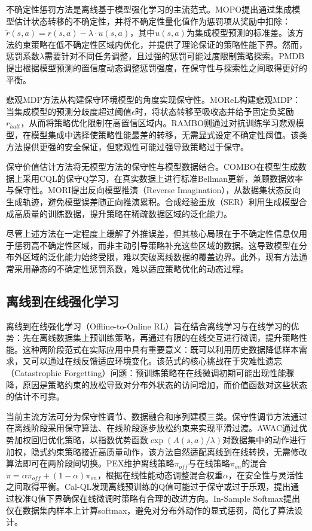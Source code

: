 不确定性惩罚方法是离线基于模型强化学习的主流范式。MOPO\cite{Yu2020MOPO}提出通过集成模型估计状态转移的不确定性，并将不确定性量化值作为惩罚项从奖励中扣除：$\tilde{r}(s,a) = r(s,a) - \lambda \cdot u(s,a)$，其中$u(s,a)$为集成模型预测的标准差。该方法约束策略在低不确定性区域内优化，并提供了理论保证的策略性能下界。然而，惩罚系数$\lambda$需要针对不同任务调整，且过强的惩罚可能过度限制策略探索。PMDB\cite{Yang2023PMDB}提出根据模型预测的置信度动态调整惩罚强度，在保守性与探索性之间取得更好的平衡。

悲观MDP方法从构建保守环境模型的角度实现保守性。MOReL\cite{Kidambi2020MOReL}构建悲观MDP：当集成模型的预测分歧度超过阈值$\epsilon$时，将状态转移至吸收态并给予固定负奖励$r_{halt}$，从而将策略优化限制在高置信区域内。RAMBO\cite{Rigter2022RAMBO}则通过对抗训练学习悲观模型，在模型集成中选择使策略性能最差的转移，无需显式设定不确定性阈值。该类方法提供更强的安全保证，但悲观性可能过强导致策略过于保守。

保守价值估计方法将无模型方法的保守性与模型数据结合。COMBO\cite{Yu2021COMBO}在模型生成数据上采用CQL的保守Q学习，在真实数据上进行标准Bellman更新，兼顾数据效率与保守性。MORI\cite{Wang2021MORI}提出反向模型推演（Reverse Imagination），从数据集状态反向生成轨迹，避免模型误差随正向推演累积。合成经验重放（SER）\cite{Lu2024SER}利用生成模型合成高质量的训练数据，提升策略在稀疏数据区域的泛化能力。

尽管上述方法在一定程度上缓解了外推误差，但其核心局限在于不确定性信息仅用于惩罚高不确定性区域，而非主动引导策略补充这些区域的数据。这导致模型在分布外区域的泛化能力始终受限，难以突破离线数据的覆盖边界。此外，现有方法通常采用静态的不确定性惩罚系数，难以适应策略优化的动态过程。


\subsection{离线到在线强化学习}\label{Sec1.2.3}

离线到在线强化学习（Offline-to-Online RL）旨在结合离线学习与在线学习的优势：先在离线数据集上预训练策略，再通过有限的在线交互进行微调，提升策略性能\cite{Nair2020AWAC,Lee2022O2O,Song2023HybridRL}。这种两阶段范式在实际应用中具有重要意义：既可以利用历史数据降低样本需求，又可以通过在线反馈适应环境变化。该范式的核心挑战在于灾难性遗忘（Catastrophic Forgetting）问题：预训练策略在在线微调初期可能出现性能骤降，原因是策略约束的放松导致对分布外状态的访问增加，而价值函数对这些状态的估计不可靠\cite{Lee2022O2O}。

当前主流方法可分为保守性调节、数据融合和序列建模三类。保守性调节方法通过在离线阶段采用保守算法、在线阶段逐步放松约束来实现平滑过渡。AWAC\cite{Nair2020AWAC}通过优势加权回归优化策略，以指数优势函数$\exp(A(s,a)/\lambda)$对数据集中的动作进行加权，隐式约束策略接近高质量动作，该方法自然适配离线到在线转换，无需修改算法即可在两阶段间切换。PEX\cite{Zhang2023PEX}维护离线策略$\pi_{off}$与在线策略$\pi_{on}$的混合$\pi = \alpha \pi_{off} + (1-\alpha) \pi_{on}$，根据在线性能动态调整混合权重$\alpha$，在安全性与灵活性之间取得平衡。Cal-QL\cite{Nakamoto2024CalQL}发现离线预训练的Q值可能过于保守或过于乐观，提出通过校准Q值下界确保在线微调时策略有合理的改进方向。In-Sample Softmax\cite{Xiao2023InSample}提出仅在数据集内样本上计算softmax，避免对分布外动作的显式惩罚，简化了算法设计。

